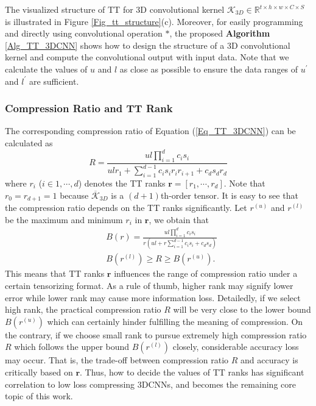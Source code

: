 \documentclass[a4paper,fleqn]{cas-dc}
\begin{document}
The visualized structure of TT for 3D convolutional kernel   \(\bm{\mathcal{K}} _{3D} \in \mathbb{R} ^{t \times h \times w \times C \times S}\)  is illustrated in Figure \ref{Fig_tt_structure}(c). Moreover, for easily programming and directly using convolutional operation \(*\), the proposed \textbf{Algorithm} \ref{Alg_TT_3DCNN} shows how to design the structure of a 3D convolutional kernel and compute the convolutional output with input data. Note that we calculate the values of \(u\) and \(l\) as close as possible to ensure the data ranges of \(u^{'}\) and \(l^{'}\) are sufficient.

\subsubsection{Compression Ratio and TT Rank}\quad

The corresponding compression ratio of Equation (\ref{Eq_TT_3DCNN}) can be calculated as
\begin{equation*}
R = \frac{ul\prod_{i=1}^d c_{i}s_{i}}{ulr_{1} + \sum_{i=1}^{d-1} c_{i}s_{i}r_{i}r_{i+1} + c_{d}s_{d}r_{d}}
\end{equation*}
where \(r_{i}\) (\(i \in {1,\cdots,d}\)) denotes the TT ranks \(\bm{r}=[r_1,\cdots,r_d]\). Note that \(r_0=r_{d+1}=1\) because \(\overline{\bm{\mathcal{K}}}_{3D}\) is a \((d+1)\)th-order tensor. It is easy to see that the compression ratio depends on the TT ranks significantly. Let \(r^{(u)}\) and \(r^{(l)}\) be the maximum and minimum \(r_{i}\) in \(\bm{r}\), we obtain that 
\begin{equation}\label{Eq_CompressRatio_3DCNN}
\begin{aligned}
&B(r) = \frac{ul\prod_{i=1}^d c_{i}s_{i}}{r(ul + r\sum_{i=1}^{d-1} c_{i}s_{i}  + c_{d}s_{d})} \\
&B(r^{(l)}) \geq R \geq B(r^{(u)}).
\end{aligned}
\end{equation}
This means that TT ranks \(\bm{r}\) influences the range of compression ratio under a certain tensorizing format. As a rule of thumb, higher rank may signify lower error while lower rank may cause more information loss. Detailedly, if we select high rank, the practical compression ratio \(R\) will be very close to the lower bound \(B(r^{(u)})\) which can certainly hinder fulfilling the meaning of compression. On the contrary, if we choose small rank to pursue extremely high compression ratio \(R\) which follows the upper bound \(B(r^{(l)})\) closely, considerable accuracy loss may occur. That is, the trade-off between compression ratio \(R\) and accuracy is critically based on \(\bm{r}\). Thus, how to decide the values of TT ranks has significant correlation to low loss compressing 3DCNNs, and becomes the remaining core topic of this work.
\end{document}

